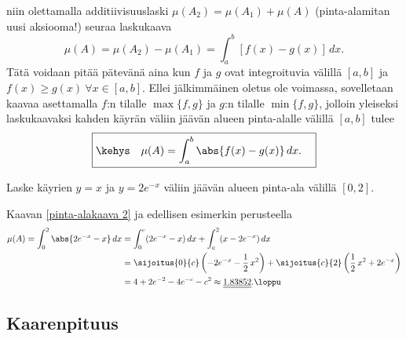 niin olettamalla additiivisuuslaski $\mu(A_2)=\mu(A_1)+\mu(A)$ (pinta-alamitan uusi aksiooma!)
seuraa laskukaava
\[
\mu(A)=\mu(A_2)-\mu(A_1)=\int_a^b [f(x)-g(x)]\,dx.
\]
Tätä voidaan pitää pätevänä aina kun $f$ ja $g$ ovat integroituvia välillä $[a,b]$ ja
$f(x) \ge g(x)\ \forall x\in[a,b]$. Ellei jälkimmäinen oletus ole voimassa, sovelletaan kaavaa 
asettamalla $f$:n tilalle $\max\{f,g\}$ ja $g$:n tilalle $\min\{f,g\}$, jolloin yleiseksi
laskukaavaksi kahden käyrän väliin jäävän alueen pinta-alalle välillä $[a,b]$ tulee
\begin{equation} \label{pinta-alakaava 2}
\boxed{\kehys\quad \mu(A)=\int_a^b \abs{f(x)-g(x)}\,dx. \quad}
\end{equation}
\begin{Exa} Laske käyrien $y=x$ ja $y=2e^{-x}$ väliin jäävän alueen pinta-ala välillä $[0,2]$.
\end{Exa}
\ratk Kaavan \eqref{pinta-alakaava 2} ja edellisen esimerkin perusteella
\begin{align*}
\mu(A) = \int_0^2 \abs{2e^{-x}-x}\,dx &= \int_0^c (2e^{-x}-x)\,dx+\int_c^2(x-2e^{-x})\,dx \\
                                      &= \sijoitus{0}{c}\left(-2e^{-x}-\frac{1}{2}\,x^2\right)
                                       + \sijoitus{c}{2}\left(\frac{1}{2}\,x^2+2e^{-x}\right) \\
                                      &=4+2e^{-2}-4e^{-c}-c^2 
                                       \approx \underline{\underline{1.83852}}. \loppu
\end{align*}                     

\subsection*{Kaarenpituus}

